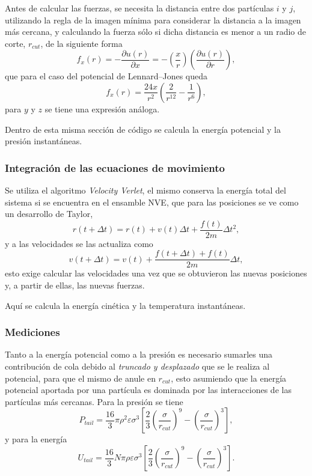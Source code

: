 \documentclass[a4paper,spanish,12pt,twoside]{article}
\begin{document}
Antes de calcular las fuerzas, se necesita la distancia entre dos partículas $i$ y $j$, utilizando la regla de la imagen mínima para considerar la distancia a la imagen más cercana, y calculando la fuerza sólo si dicha distancia es menor a un radio de corte, $r_{cut}$, de la siguiente forma
$$
f_x(r) = -\frac{\partial u(r)}{\partial x} = - \left(\frac{x}{r}\right) \left( \frac{\partial u(r)}{\partial r} \right),
$$
que para el caso del potencial de Lennard--Jones queda
$$
f_x(r) = \frac{24x}{r^2} \left( \frac{2}{r^{12}} - \frac{1}{r^6} \right),
$$
para $y$ y $z$ se tiene una expresión análoga.

Dentro de esta misma sección de código se calcula la energía potencial y la presión instantáneas. 

\subsubsection{Integración de las ecuaciones de movimiento}

Se utiliza el algoritmo \textit{Velocity Verlet}, el mismo conserva la energía total del sistema si se encuentra en el ensamble NVE, que para las posiciones se ve como un desarrollo de Taylor,
$$
r(t + \Delta t) = r(t) + v(t) \Delta t + \frac{f(t)}{2m} \Delta t^2,
$$
y a las velocidades se las actualiza como
$$
v(t + \Delta t) = v(t) + \frac{f(t + \Delta t) + f(t)}{2m} \Delta t,
$$
esto exige calcular las velocidades una vez que se obtuvieron las nuevas posiciones y, a partir de ellas, las nuevas fuerzas.

Aquí se calcula la energía cinética y la temperatura instantáneas.

\subsubsection{Mediciones}

Tanto a la energía potencial como a la presión es necesario sumarles una contribución de cola debido al \textit{truncado y desplazado} que se le realiza al potencial, para que el mismo de anule en $r_{cut}$, esto asumiendo que la energía potencial aportada por una partícula es dominada por las interacciones de las partículas más cercanas. Para la presión se tiene
$$
P_{tail} = \frac{16}{3}\pi\rho^2\varepsilon\sigma^3 \left[ \frac{2}{3}\left( \frac{\sigma}{r_{cut}} \right)^9 - \left( \frac{\sigma}{r_{cut}} \right)^3 \right],
$$
y para la energía
$$
U_{tail} = \frac{16}{3}N\pi\rho\varepsilon\sigma^3 \left[ \frac{2}{3}\left( \frac{\sigma}{r_{cut}} \right)^9 - \left( \frac{\sigma}{r_{cut}} \right)^3 \right].
$$
\end{document}
